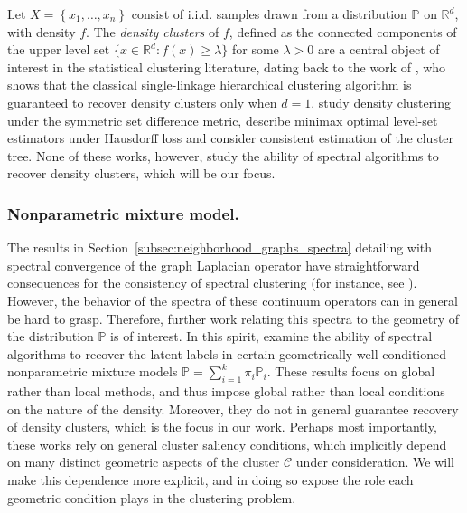 \documentclass{article}
\newcommand{\Reals}{\mathbb{R}}
\newcommand{\set}[1]{\left\{#1\right\}}
\newcommand{\1}{\mathbf{1}}
\newcommand{\Rd}{\Reals^d}
\newcommand{\Cset}{\mathcal{C}}
\newcommand{\Pbb}{\mathbb{P}}
\theoremstyle{alden}
\theoremstyle{aldenthm}
\theoremstyle{definition}
\theoremstyle{remark}
\begin{document}
Let $X = \set{x_1,\ldots,x_n}$ consist of i.i.d. samples drawn from a distribution $\Pbb$ on $\Reals^d$, with density $f$. The \emph{density clusters} of $f$, defined as the connected components of
the upper level set $\{x \in \Rd : f(x) \geq \lambda\}$ for some $\lambda > 0$
are a central object of interest in the statistical clustering literature, dating
back to the work of \citet{hartigan1981}, who shows that the classical single-linkage hierarchical clustering algorithm is guaranteed to recover density clusters only when $d = 1$. \citet{polonik1995, rigollet2009} study density clustering under the 
symmetric set difference metric, \citet{tsybakov1997, singh2009} describe
minimax optimal level-set estimators under Hausdorff loss and
\citet{hartigan1981, chaudhuri2010, balakrishnan2013,kpotufe11} consider consistent estimation of the
cluster tree. None of these works, however, study the ability of spectral algorithms to recover density clusters, which will be our focus. 

\subsubsection{Nonparametric mixture model.}

The results in Section~\ref{subsec:neighborhood_graphs_spectra} detailing with spectral convergence of the graph Laplacian operator have straightforward consequences for the consistency of spectral clustering (for instance, see \cite{vonluxburg2008,garciatrillos18}). However, the behavior of the spectra of these continuum operators can in general be hard to grasp. Therefore, further work relating this spectra to the geometry of the distribution $\Pbb$ is of interest. In this spirit, \citet{shi2009,schiebinger2015,garciatrillos19,ariascastro11} examine the ability of spectral algorithms to recover the latent labels in certain geometrically well-conditioned nonparametric mixture models $\Pbb = \sum_{i = 1}^{k} \pi_i \Pbb_i$. These results focus on global rather than local 
methods, and thus impose global rather than local conditions on the nature
of the density. Moreover, they do not in general guarantee recovery of density 
clusters, which is the focus in our work. Perhaps most importantly, these works
rely on general cluster saliency conditions, which implicitly depend on many
distinct geometric aspects of the cluster $\Cset$ under consideration. We will make
this dependence more explicit, and in doing so expose the role each geometric
condition plays in the clustering problem. 
\end{document}
